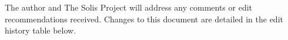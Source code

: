 The author and The Solis Project will address any comments or edit recommendations received. Changes to this document are detailed in the edit history table below.
